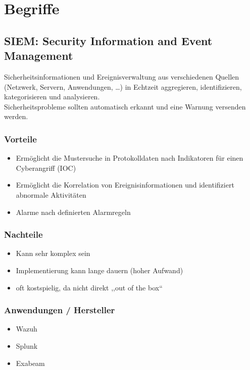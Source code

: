 

\section{Begriffe}\label{sec:Begriffe}

\subsection{SIEM: Security Information and Event Management}\label{subsec:siem}
Sicherheitsinformationen und Ereignisverwaltung aus verschiedenen Quellen (Netzwerk, Servern, Anwendungen, \ldots) in Echtzeit aggregieren, identifizieren, kategorisieren und analysieren.\\
Sicherheitsprobleme sollten automatisch erkannt und eine Warnung versenden werden.
\subsubsection{Vorteile}
\begin{itemize}
    \item Ermöglicht die Mustersuche in Protokolldaten nach Indikatoren für einen Cyberangriff (IOC)
    \item Ermöglicht die Korrelation von Ereignisinformationen und identifiziert abnormale Aktivitäten
    \item Alarme nach definierten Alarmregeln
\end{itemize}

\subsubsection{Nachteile}
\begin{itemize}
    \item Kann sehr komplex sein
    \item Implementierung kann lange dauern (hoher Aufwand)
    \item oft kostspielig, da nicht direkt ,,out of the box``
\end{itemize}

\subsubsection{Anwendungen / Hersteller}
\begin{itemize}
    \item Wazuh
    \item Splunk
    \item Exabeam
\end{itemize}


